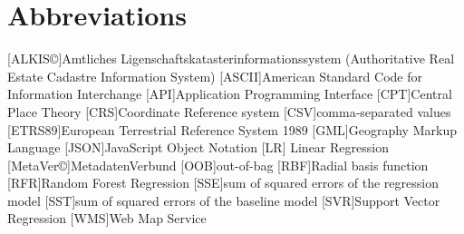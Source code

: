 \documentclass[a4paper, 11pt, oneside]{Thesis}  %
\begin{document}



\pagestyle{fancy}  %


\tableofcontents  %

\listoffigures  %

\listoftables  %

\clearpage  %
\chapter{Abbreviations}


\begin{acronym}
[ALKIS\copyright]{Amtliches Ligenschaftskatasterinformationssystem (Authoritative Real Estate Cadastre Information System)}
[ASCII]{American Standard Code for Information Interchange}
[API]{Application Programming Interface}
[CPT]{Central Place Theory}
[CRS]{Coordinate Reference system}
[CSV]{comma-separated values}
[ETRS89]{European Terrestrial Reference System 1989}
[GML]{Geography Markup Language}
[JSON]{JavaScript Object Notation}
[LR] {Linear Regression}
[MetaVer\copyright]{MetadatenVerbund}
[OOB]{out-of-bag}
[RBF]{Radial basis function}
[RFR]{Random Forest Regression}
[SSE]{sum of squared errors of the regression model}
[SST]{sum of squared errors of the baseline model}
[SVR]{Support Vector Regression}
[WMS]{Web Map Service}

\end{acronym}
\end{document}

